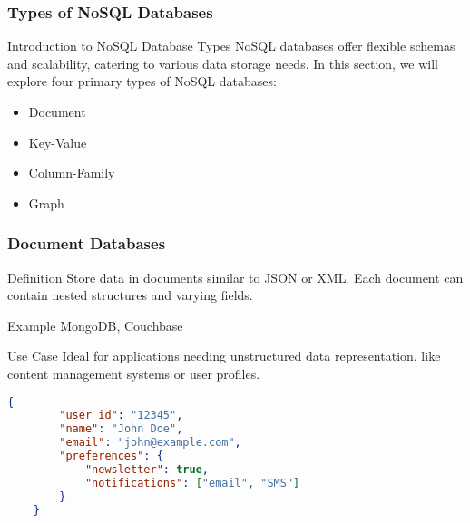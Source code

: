 \documentclass[aspectratio=169]{beamer}
\begin{document}
\begin{frame}
    \frametitle{Types of NoSQL Databases}
    \begin{block}{Introduction to NoSQL Database Types}
        NoSQL databases offer flexible schemas and scalability, catering to various data storage needs. 
        In this section, we will explore four primary types of NoSQL databases:
        \begin{itemize}
            \item Document
            \item Key-Value
            \item Column-Family
            \item Graph
        \end{itemize}
    \end{block}
\end{frame}

\begin{frame}[fragile]
    \frametitle{Document Databases}
    \begin{block}{Definition}
        Store data in documents similar to JSON or XML. Each document can contain nested structures and varying fields.
    \end{block}
    
    \begin{block}{Example}
        MongoDB, Couchbase
    \end{block}
    
    \begin{block}{Use Case}
        Ideal for applications needing unstructured data representation, like content management systems or user profiles.
    \end{block}
    
    \begin{lstlisting}[language=json]
    {
        "user_id": "12345",
        "name": "John Doe",
        "email": "john@example.com",
        "preferences": {
            "newsletter": true,
            "notifications": ["email", "SMS"]
        }
    }
    \end{lstlisting}
\end{frame}
\end{document}
